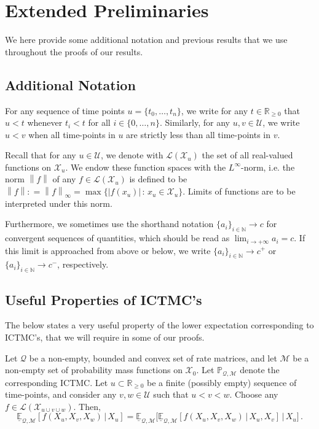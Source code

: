 \documentclass[twoside,11pt]{article}
\newcommand{\nats}{\mathbb{N}}
\newcommand{\reals}{\mathbb{R}}
\newcommand{\realsnonneg}{\reals_{\geq 0}}
\newcommand{\states}{\mathcal{X}}
\newcommand{\lexp}{\underline{\mathbb{E}}_{\rateset,\mathcal{M}}}
\newcommand{\gambles}{\mathcal{L}}
\newcommand{\rateset}{\mathcal{Q}}
\newcommand{\norm}[1]{\left\lVert #1 \right\rVert}
\newcommand{\abs}[1]{\left\vert #1 \right\vert}
\newcommand{\coloneqq}{:\!=}
\begin{document}
\appendix
{}

%


\newpage


\section{Extended Preliminaries}

We here provide some additional notation and previous results that we use throughout the proofs of our results.

\subsection{Additional Notation}

For any sequence of time points $u=\{t_0,\ldots,t_n\}$, we write for any $t\in\realsnonneg$ that $u<t$ whenever $t_i<t$ for all $i\in\{0,\ldots,n\}$. Similarly, for any $u,v\in\mathcal{U}$, we write $u< v$ when all time-points in $u$ are strictly less than all time-points in $v$.

Recall that for any $u\in\mathcal{U}$, we denote with $\gambles(\states_u)$ the set of all real-valued functions on $\states_u$. We endow these function spaces with the $L^\infty$-norm, i.e. the norm $\norm{f}$ of any $f\in\gambles(\states_u)$ is defined to be $\norm{f}\coloneqq\norm{f}_\infty=\max\{\abs{f(x_u)}\,:\,x_u\in\states_u\}$. Limits of functions are to be interpreted under this norm.

Furthermore, we sometimes use the shorthand notation $\{a_i\}_{i\in\nats}\to c$ for convergent sequences of quantities, which should be read as $\lim_{i\to+\infty}a_i=c$. If this limit is approached from above or below, we write $\{a_i\}_{i\in\nats}\to c^+$ or $\{a_i\}_{i\in\nats}\to c^-$, respectively.

\subsection{Useful Properties of ICTMC's}

The below states a very useful property of the lower expectation corresponding to ICTMC's, that we will require in some of our proofs.

\begin{lemma}\cite[Theorem 6.5]{krak2016ictmc}\label{lemma:iterated_lower}
Let $\rateset$ be a non-empty, bounded and convex set of rate matrices, and let $\mathcal{M}$ be a non-empty set of probability mass functions on $\states_0$. Let $\mathbb{P}_{\rateset,\mathcal{M}}$ denote the corresponding ICTMC.
Let $u\subset\realsnonneg$ be a finite (possibly empty) sequence of time-points, and consider any $v,w\in\mathcal{U}$ such that $u<v<w$. Choose any $f\in\gambles(\states_{u\cup v\cup w})$. Then,
\begin{equation*}
\lexp[f(X_u,X_v,X_w)\,\vert\,X_u] = \lexp\bigl[\lexp[f(X_u,X_v,X_w)\,\vert\,X_u,X_v]\,\vert\,X_u\bigr]\,.
\end{equation*}
\end{lemma}
\end{document}
